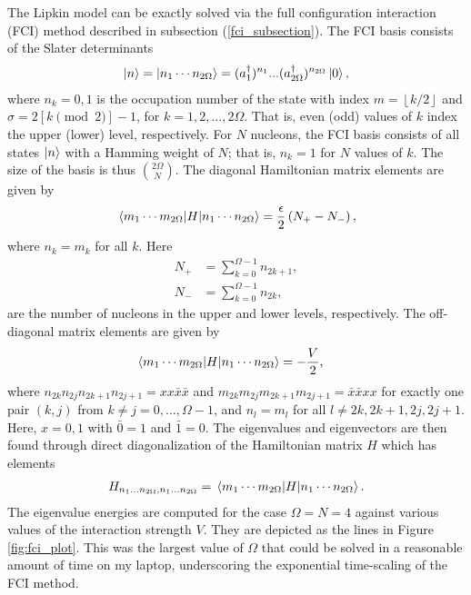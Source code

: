 \documentclass[10pt]{article}
\begin{document}
The Lipkin model can be exactly solved via the full configuration interaction (FCI) method described in subsection (\ref{fci_subsection}). The FCI basis consists of the Slater determinants
\begin{align}
\ket{n}=\ket{n_1\cdots n_{2\Omega}}=(a^\dagger_1)^{n_1}...(a^\dagger_{2\Omega})^{n_{2\Omega}}\ket{0},
\end{align}
where $n_k=0,1$ is the occupation number of the state with index $m=\left \lfloor{k/2}\right \rfloor$ and $\sigma = 2[k \pmod2]-1$, for $k=1,2,...,2\Omega$. That is, even (odd) values of $k$ index the upper (lower) level, respectively. For $N$ nucleons, the FCI basis consists of all states $\ket{n}$ with a Hamming weight of $N$; that is, $n_k=1$ for $N$ values of $k$. The size of the basis is thus ${2\Omega \choose N}$. The diagonal Hamiltonian matrix elements are given by
\begin{align}
\mel{m_1\cdots m_{2\Omega}}{H}{n_1\cdots n_{2\Omega}}
=
\frac{\epsilon}{2}\left(N_+-N_-\right),
\end{align}
where $n_k=m_k$ for all $k$. Here
\begin{align}
N_+
&=
\sum_{k=0}^{\Omega-1}n_{2k+1},
\\
N_-
&=
\sum_{k=0}^{\Omega-1}n_{2k},
\end{align}
are the number of nucleons in the upper and lower levels, respectively. The off-diagonal matrix elements are given by
\begin{align}
\mel{m_1\cdots m_{2\Omega}}{H}{n_1\cdots n_{2\Omega}}
&=
-\frac{V}{2}
,\end{align}
where $n_{2k}n_{2j}n_{2k+1}n_{2j+1}=xx\bar{x}\bar{x}$ and $m_{2k}m_{2j}m_{2k+1}m_{2j+1}=\bar{x}\bar{x}xx$ for exactly one pair $(k,j)$ from $k\neq j=0,...,\Omega-1$, and $n_l=m_l$ for all $l\neq 2k,2k+1,2j,2j+1$. Here, $x=0,1$ with $\bar{0}=1$ and $\bar{1}=0$. The eigenvalues and eigenvectors are then found through direct diagonalization of the Hamiltonian matrix $H$ which has elements 
\begin{align}
H_{n_1\ldots n_{2\Omega},{n_1\ldots n_{2\Omega}}}=\mel{m_1\cdots m_{2\Omega}}{H}{n_1\cdots n_{2\Omega}}.   
\end{align}
The eigenvalue energies are computed for the case $\Omega=N=4$ against various values of the interaction strength $V$. They are depicted as the lines in Figure \ref{fig:fci_plot}. This was the largest value of $\Omega$ that could be solved in a reasonable amount of time on my laptop, underscoring the exponential time-scaling of the FCI method.
\end{document}
